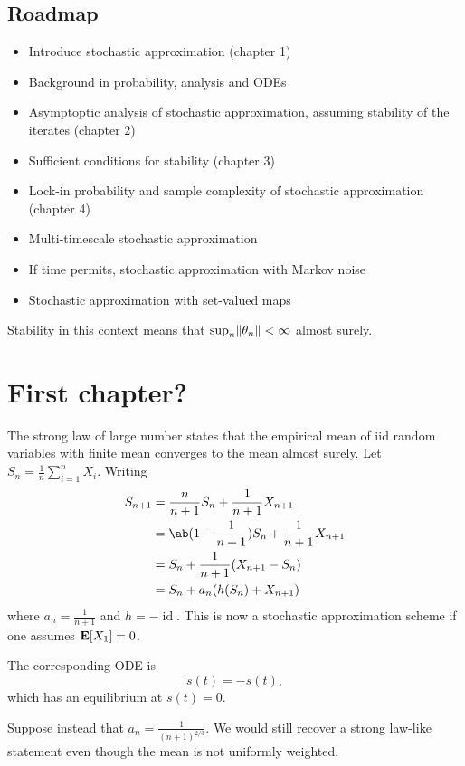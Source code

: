 \section*{Roadmap}
\begin{itemize}
    \item Introduce stochastic approximation (chapter 1)
    \item Background in probability, analysis and ODEs
    \item Asymptoptic analysis of stochastic approximation, assuming
        stability of the iterates (chapter 2)
    \item Sufficient conditions for stability (chapter 3)
    \item Lock-in probability and sample complexity of stochastic
        approximation (chapter 4)
    \item Multi-timescale stochastic approximation
    \item If time permits, stochastic approximation with Markov noise
    \item Stochastic approximation with set-valued maps
\end{itemize}
Stability in this context means that $\sup_n \lVert\theta_n\rVert < \infty$
almost surely.

\chapter{First chapter?}
The strong law of large number states that the empirical mean of iid random
variables with finite mean converges to the mean almost surely.
Let $S_n = \frac1n \sum_{i=1}^n X_i$.
Writing \begin{align*}
    S_{n+1} &= \frac n{n+1} S_n + \frac1{n+1} X_{n+1} \\
        &= \ab(1 - \frac1{n+1}) S_n + \frac1{n+1} X_{n+1} \\
        &= S_n + \frac1{n+1} (X_{n+1} - S_n) \\
        &= S_n + a_n (h(S_n) + X_{n+1})
\end{align*}
where $a_n = \frac1{n+1}$ and $h = -\operatorname{id}$.
This is now a stochastic approximation scheme if one assumes $\operatorname{\mathbf E}[X_1] = 0$.

The corresponding ODE is \[
    \dot{s}(t) = -s(t),
\] which has an equilibrium at $s(t) = 0$.

Suppose instead that $a_n = \frac1{(n+1)^{2/3}}$.
We would still recover a strong law-like statement even though the mean is
not uniformly weighted.
